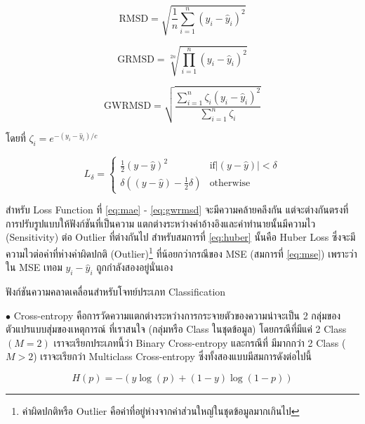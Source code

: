 \begin{equation}\label{eq:rmsd}
    \text{RMSD} = \sqrt{ \frac{1}{n} \sum_{i=1}^{n} (y_{i} - \hat{y}_{i})^{2} }
\end{equation}

\begin{equation}\label{eq:grmsd}
    \text{GRMSD} = \sqrt[2n]{ \prod_{i=1}^{n} (y_{i} - \hat{y}_{i})^{2} }
\end{equation}

\begin{equation}\label{eq:gwrmsd}
    \text{GWRMSD} = \sqrt{ \frac{\sum_{i=1}^{n} \zeta_{i} (y_{i} - \hat{y}_{i})^{2}}{\sum_{i=1}^{n} \zeta_{i} } }
\end{equation}

\noindent โดยที่ $\zeta_{i} = e^{-(y_{i} - \hat{y}_{i}) / c}$

\begin{equation}\label{eq:huber}
    L_{\delta}=
    \left\{\begin{matrix}
        \frac{1}{2}(y - \hat{y})^{2} & \text{if} \left | (y - \hat{y})  \right | < \delta\\
        \delta ((y - \hat{y}) - \frac1 2 \delta) & \text{otherwise}
    \end{matrix}\right.
\end{equation}

สำหรับ Loss Function ที่ \ref{eq:mae} - \ref{eq:gwrmsd} จะมีความคล้ายคลึงกัน แต่จะต่างกันตรงที่การปรับรูปแบบให้ฟังก์ชันที่เป็นความ%
แตกต่างระหว่างค่าอ้างอิงและค่าทำนายนั้นมีความไว (Sensitivity) ต่อ Outlier ที่ต่างกันไป สำหรับสมการที่ \ref{eq:huber} นั้นคือ Huber
Loss ซึ่งจะมีความไวต่อค่าที่ห่างค่าผิดปกติ (Outlier)\footnote{ค่าผิดปกติหรือ Outlier คือค่าที่อยู่ห่างจากค่าส่วนใหญ่ในชุดข้อมูลมากเกินไป} 
ที่น้อยกว่ากรณีของ MSE (สมการที่ \ref{eq:mse}) เพราะว่าใน MSE เทอม $y_{i} - \hat{y}_{i}$ ถูกกำลังสองอยู่นั่นเอง

ฟังก์ชันความคลาดเคลื่อนสำหรับโจทย์ประเภท Classification

\noindent $\bullet$ Cross-entropy คือการวัดความแตกต่างระหว่างการกระจายตัวของความน่าจะเป็น 2 กลุ่มของตัวแปรแบบสุ่มของเหตุการณ์%
ที่เราสนใจ (กลุ่มหรือ Class ในชุดข้อมูล) โดยกรณีที่มีแค่ 2 Class $(M = 2)$ เราจะเรียกประเภทนี้ว่า Binary Cross-entropy และกรณีที่%
มีมากกว่า 2 Class ($M > 2$) เราจะเรียกว่า Multiclass Cross-entropy ซึ่งทั้งสองแบบมีสมการดังต่อไปนี้

\begin{equation}
    H(p) = -{(y\log(p) + (1 - y)\log(1 - p))}
\end{equation}

